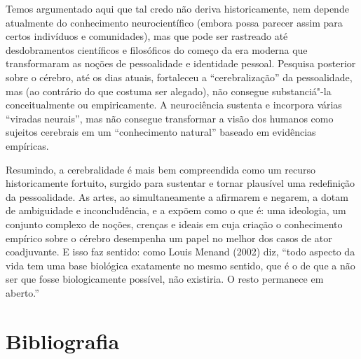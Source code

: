 Temos argumentado aqui que tal credo não deriva historicamente, nem
depende atualmente do conhecimento neurocientífico (embora possa parecer
assim para certos indivíduos e comunidades), mas que pode ser rastreado
até desdobramentos científicos e filosóficos do começo da era moderna
que transformaram as noções de pessoalidade e identidade pessoal.
Pesquisa posterior sobre o cérebro, até os dias atuais, fortaleceu a
``cerebralização'' da pessoalidade, mas (ao contrário do que costuma ser
alegado), não consegue substanciá"-la conceitualmente ou empiricamente. A
neurociência sustenta e incorpora várias ``viradas neurais'', mas não
consegue transformar a visão dos humanos como sujeitos cerebrais em um
``conhecimento natural'' baseado em evidências empíricas.

Resumindo, a cerebralidade é mais bem compreendida como um recurso
historicamente fortuito, surgido para sustentar e tornar plausível uma
redefinição da pessoalidade. As artes, ao simultaneamente a afirmarem e
negarem, a dotam de ambiguidade e inconcludência, e a expõem como o que
é: uma ideologia, um conjunto complexo de noções, crenças e ideais em
cuja criação o conhecimento empírico sobre o cérebro desempenha um papel
no melhor dos casos de ator coadjuvante. E isso faz sentido: como Louis
Menand (2002) diz, ``todo aspecto da vida tem uma base biológica
exatamente no mesmo sentido, que é o de que a não ser que fosse
biologicamente possível, não existiria. O resto permanece em aberto.''

\chapter{Bibliografia}

